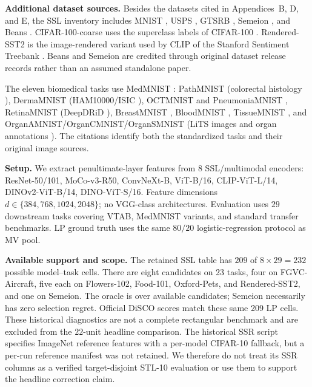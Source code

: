 \documentclass{article}
\begin{document}
\textbf{Additional dataset sources.} Besides the datasets cited in Appendices~B, D, and E, the SSL inventory includes MNIST \citep{lecun1998mnist}, USPS \citep{hull1994usps}, GTSRB \citep{stallkamp2011gtsrb}, Semeion \citep{semeion1998digits}, and Beans \citep{makererebeans}. CIFAR-100-coarse uses the superclass labels of CIFAR-100 \citep{krizhevsky2009cifar}. Rendered-SST2 is the image-rendered variant used by CLIP \citep{radford2021clip} of the Stanford Sentiment Treebank \citep{socher2013sst}. Beans and Semeion are credited through original dataset release records rather than an assumed standalone paper.

The eleven biomedical tasks use MedMNIST \citep{yang2023medmnist}: PathMNIST (colorectal histology \citep{kather2019path}), DermaMNIST (HAM10000/ISIC \citep{tschandl2018ham,codella2019isic}), OCTMNIST and PneumoniaMNIST \citep{kermany2018medical}, RetinaMNIST (DeepDRiD \citep{liu2022deepdrid}), BreastMNIST \citep{aldhabyani2020breast}, BloodMNIST \citep{acevedo2020blood}, TissueMNIST \citep{ljosa2012tissue}, and OrganAMNIST/OrganCMNIST/OrganSMNIST (LiTS images and organ annotations \citep{bilic2019lits,xu2019organs}). The citations identify both the standardized tasks and their original image sources.

\textbf{Setup.}  We extract penultimate-layer features from $8$ SSL/multimodal encoders: ResNet-50/101, MoCo-v3-R50, ConvNeXt-B, ViT-B/16, CLIP-ViT-L/14, DINOv2-ViT-B/14, DINO-ViT-S/16.  Feature dimensions $d \in \{384, 768, 1024, 2048\}$; no VGG-class architectures.  Evaluation uses $29$ downstream tasks covering VTAB, MedMNIST variants, and standard transfer benchmarks.  LP ground truth uses the same $80/20$ logistic-regression protocol as MV pool.

\textbf{Available support and scope.} The retained SSL table has $209$ of $8\times29=232$ possible model--task cells. There are eight candidates on 23 tasks, four on FGVC-Aircraft, five each on Flowers-102, Food-101, Oxford-Pets, and Rendered-SST2, and one on Semeion. The oracle is over available candidates; Semeion necessarily has zero selection regret. Official DiSCO scores match these same 209 LP cells. These historical diagnostics are not a complete rectangular benchmark and are excluded from the $22$-unit headline comparison. The historical SSR script specifies ImageNet reference features with a per-model CIFAR-10 fallback, but a per-run reference manifest was not retained. We therefore do not treat its SSR columns as a verified target-disjoint STL-10 evaluation or use them to support the headline correction claim.
\end{document}
